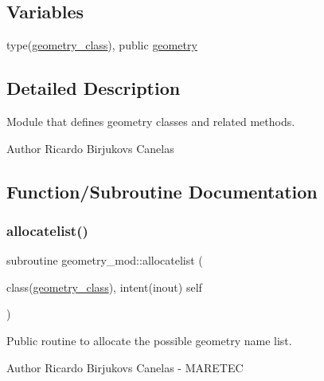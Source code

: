\subsection*{Variables}
\begin{DoxyCompactItemize}
\item 
type(\mbox{\hyperlink{structgeometry__mod_1_1geometry__class}{geometry\+\_\+class}}), public \mbox{\hyperlink{namespacegeometry__mod_ad2ad4f7e1138beaad5f37d5c15b7b457}{geometry}}
\end{DoxyCompactItemize}


\subsection{Detailed Description}
Module that defines geometry classes and related methods. 

\begin{DoxyAuthor}{Author}
Ricardo Birjukovs Canelas 
\end{DoxyAuthor}


\subsection{Function/\+Subroutine Documentation}
\mbox{\label{namespacegeometry__mod_a1b6f259b0b6be71e02ffae7670f7d8ba}} 
\subsubsection{\texorpdfstring{allocatelist()}{allocatelist()}}
{\footnotesize\ttfamily subroutine geometry\+\_\+mod\+::allocatelist (\begin{DoxyParamCaption}\item[{class(\mbox{\hyperlink{structgeometry__mod_1_1geometry__class}{geometry\+\_\+class}}), intent(inout)}]{self }\end{DoxyParamCaption})\hspace{0.3cm}{\ttfamily [private]}}



Public routine to allocate the possible geometry name list. 

\begin{DoxyAuthor}{Author}
Ricardo Birjukovs Canelas -\/ M\+A\+R\+E\+T\+EC 
\end{DoxyAuthor}


